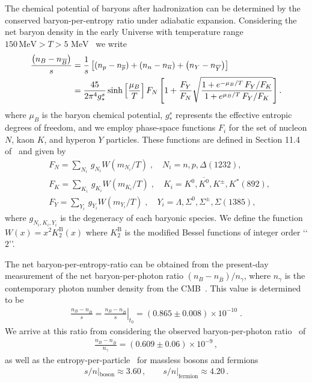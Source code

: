 \documentclass[universe,article,submit,moreauthors,pdftex,a4paper]{Definitions/mdpi}
\newcommand{\MeV}{\text{ MeV}}
\begin{document}
The chemical potential of baryons after hadronization can be determined by the conserved baryon-per-entropy ratio under adiabatic expansion. Considering the net baryon density in the early Universe with temperature range $150\,\mathrm{MeV}>T>5\MeV$~\cite{Yang:2021bko} we write
\begin{align}\label{Baryon_ChemicalPotential}
\frac{\left(n_B-n_{\overline{B}}\right)}{s}&=\frac{1}{s}\left[\left(n_p-n_{\overline{p}}\right)+\left(n_n-n_{\overline{n}}\right)+\left(n_Y-n_{\overline{Y}}\right)\right]\notag\\
&=\frac{45}{2\pi^4g^s_\ast}\sinh\left[\frac{\mu_B}{T}\right]F_N\left[1+\frac{F_Y}{F_N}\sqrt{\frac{1+e^{-\mu_B/T}\,F_Y/F_K}{1+e^{\mu_B/T}\,F_Y/F_K}}\right].
\end{align}
where $\mu_{B}$ is the baryon chemical potential, $g_{*}^{s}$ represents the effective entropic degrees of freedom, and we employ phase-space functions $F_i$ for the set of nucleon $N$, kaon $K$, and hyperon $Y$ particles. These functions are defined in Section 11.4 of~\cite{Letessier:2002ony} and given by
\begin{align}
&F_N=\sum_{N_i}\,g_{N_i}W(m_{N_i}/T)\;, \quad N_i=n, p, \Delta(1232),\\
&F_K=\sum_{K_i}\,g_{K_i}W(m_{K_i}/T)\;, \quad K_i=K^0, \overline{K^0}, K^\pm, K^\ast(892),\\
&F_Y=\sum_{Y_i}\,g_{Y_i}W(m_{Y_i}/T)\;, \quad Y_i=\Lambda, \Sigma^0,\Sigma^\pm, \Sigma(1385),
\end{align}
where $g_{N_i,K_i,Y_i}$ is the degeneracy of each baryonic species. We define the function $W(x)=x^2K^\mathrm{B}_2(x)$ where $K^\mathrm{B}_2$ is the modified Bessel functions of integer order \lq\lq$2$\rq\rq. 

The net baryon-per-entropy-ratio can be obtained from the present-day measurement of the net baryon-per-photon ratio $\left(n_{B}-n_{\overline{B}}\right)/n_{\gamma}$, where $n_{\gamma}$ is the contemporary photon number density from the CMB~\cite{Yang:2021bko}. This value is determined to be
\begin{align}\label{BdS}
\frac{n_B-n_{\overline{B}}}{s}= \left.\frac{n_B-n_{\overline{B}}}{s}\right|_{t_0}=(0.865\pm0.008)\times10^{-10} \;.
\end{align}
We arrive at this ratio from considering the observed baryon-per-photon ratio~\cite{ParticleDataGroup:2018ovx} of
\begin{align}
 \frac{n_B-n_{\overline{B}}}{n_\gamma}= (0.609\pm0.06)\times10^{-9}\,, 
\end{align}
as well as the entropy-per-particle~\cite{Fromerth:2012fe} for massless bosons and fermions 
\begin{align}
s/n|_\mathrm{boson}\approx 3.60\,,\qquad
s/n|_\mathrm{fermion}\approx 4.20\,.
\end{align}
\end{document}
